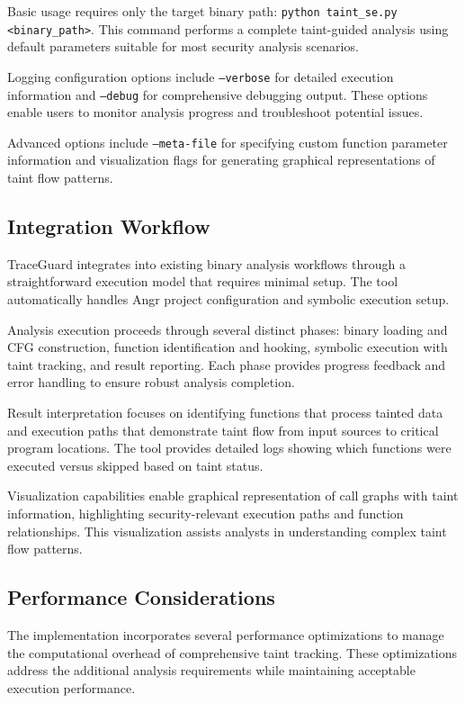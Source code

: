 Basic usage requires only the target binary path: \texttt{python taint\_se.py <binary\_path>}. This command performs a complete taint-guided analysis using default parameters suitable for most security analysis scenarios.

Logging configuration options include \texttt{--verbose} for detailed execution information and \texttt{--debug} for comprehensive debugging output. These options enable users to monitor analysis progress and troubleshoot potential issues.

Advanced options include \texttt{--meta-file} for specifying custom function parameter information and visualization flags for generating graphical representations of taint flow patterns.

\subsection{Integration Workflow}

TraceGuard integrates into existing binary analysis workflows through a straightforward execution model that requires minimal setup. The tool automatically handles Angr project configuration and symbolic execution setup.

Analysis execution proceeds through several distinct phases: binary loading and CFG construction, function identification and hooking, symbolic execution with taint tracking, and result reporting. Each phase provides progress feedback and error handling to ensure robust analysis completion.

Result interpretation focuses on identifying functions that process tainted data and execution paths that demonstrate taint flow from input sources to critical program locations. The tool provides detailed logs showing which functions were executed versus skipped based on taint status.

Visualization capabilities enable graphical representation of call graphs with taint information, highlighting security-relevant execution paths and function relationships. This visualization assists analysts in understanding complex taint flow patterns.

\subsection{Performance Considerations}

The implementation incorporates several performance optimizations to manage the computational overhead of comprehensive taint tracking. These optimizations address the additional analysis requirements while maintaining acceptable execution performance.

